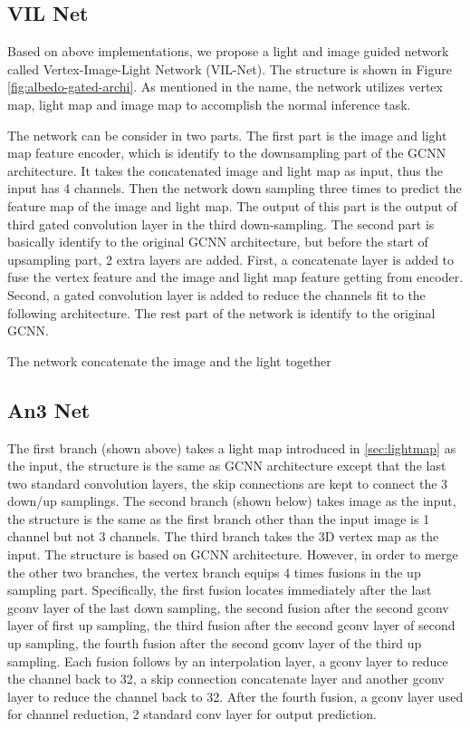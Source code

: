 \documentclass[border=15pt, multi, tikz]{article}
\begin{document}
	
	
	

\subsection{VIL Net}
Based on above implementations, we propose a light and image guided network called Vertex-Image-Light Network (VIL-Net). 
The structure is shown in Figure \ref{fig:albedo-gated-archi}. As mentioned in the name, the network utilizes vertex map, light map and image map to accomplish the normal inference task. 

The network can be consider in two parts. The first part is the image and light map feature encoder, which is identify to the downsampling part of the GCNN architecture. It takes the concatenated image and light map as input, thus the input has 4 channels. Then the network down sampling three times to predict the feature map of the image and light map. The output of this part is the output of third gated convolution layer in the third down-sampling. 
The second part is basically identify to the original GCNN architecture, but before the start of upsampling part, 2 extra layers are added. First, a concatenate layer is added to fuse the vertex feature and the image and light map feature getting from encoder. Second, a gated convolution layer is added to reduce the channels fit to the following architecture. The rest part of the network is identify to the original GCNN. 

The network concatenate the image and the light together 






\subsection{An3 Net}
The first branch (shown above) takes a light map introduced in \ref{sec:lightmap} as the input, the structure is the same as GCNN architecture except that the last two standard convolution layers, the skip connections are kept to connect the 3 down/up samplings. 
The second branch (shown below) takes image as the input, the structure is the same as the first branch other than the input image is 1 channel but not 3 channels. 
The third branch takes the 3D vertex map as the input. The structure is based on GCNN architecture. However, in order to merge the other two branches, the vertex branch equips 4 times fusions in the up sampling part. Specifically, the first fusion locates immediately after the last gconv layer of the last down sampling, the second fusion after the second gconv layer of first up sampling, the third fusion after the second gconv layer of second up sampling, the fourth fusion after the second gconv layer of the third up sampling. Each fusion follows by an interpolation layer, a gconv layer to reduce the channel back to 32, a skip connection concatenate layer and another gconv layer to reduce the channel back to 32. After the fourth fusion, a gconv layer used for channel reduction, 2 standard conv layer for output prediction.
\end{document}
